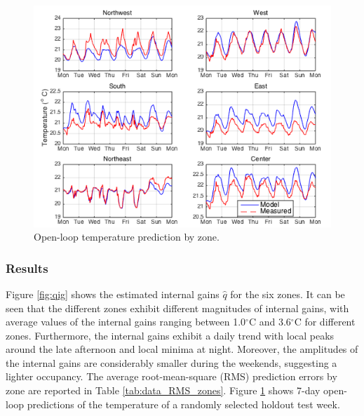 \begin{figure}[t]
\centering
\includegraphics[scale=0.40]{chapters/building_exp/figures/open_loop_traj_spring.png}
\caption{Open-loop temperature prediction by zone.}
\label{fig:building_prediction}
\vspace*{-0.45cm}
\end{figure}



\subsubsection{Results}

Figure \ref{fig:qig} shows the estimated internal gains $\hat{q}$ for the six zones. It can be seen that the different zones exhibit different magnitudes of internal gains, with average values of the internal gains ranging between 1.0$^{\circ}$C and 3.6$^{\circ}$C for different zones. 
Furthermore, the internal gains exhibit a daily trend with local peaks around the late afternoon and local minima at night. Moreover, the amplitudes of the internal gains are considerably smaller during the weekends, suggesting a lighter occupancy.
The average root-mean-square (RMS) prediction errors by zone are reported in Table \ref{tab:data_RMS_zones}.	
Figure \ref{fig:building_prediction} shows 7-day open-loop predictions of the temperature of a randomly selected holdout test week.

